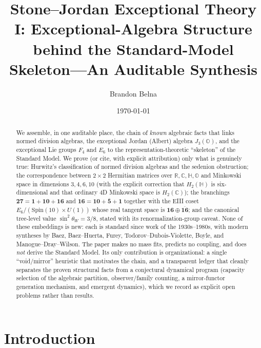 \documentclass[aps,prresearch,onecolumn,amsmath,amssymb,nofootinbib]{revtex4-2}
\theoremstyle{plain}\newtheorem{theorem}{Theorem}[section]\newtheorem{proposition}[theorem]{Proposition}\newtheorem{lemma}[theorem]{Lemma}\newtheorem{corollary}[theorem]{Corollary}
\theoremstyle{definition}\newtheorem{definition}[theorem]{Definition}\newtheorem{conjecture}[theorem]{Conjecture}
\theoremstyle{remark}\newtheorem{remark}[theorem]{Remark}
\begin{document}
\title{Stone--Jordan Exceptional Theory I: Exceptional-Algebra Structure behind the Standard-Model Skeleton---An Auditable Synthesis}
\author{Brandon Belna}
\date{\today}

\begin{abstract}
We assemble, in one auditable place, the chain of \emph{known} algebraic facts that links normed division algebras, the exceptional Jordan (Albert) algebra $J_3(\mathbb{O})$, and the exceptional Lie groups $F_4$ and $E_6$ to the representation-theoretic ``skeleton'' of the Standard Model. We prove (or cite, with explicit attribution) only what is genuinely true: Hurwitz's classification of normed division algebras and the sedenion obstruction; the correspondence between $2\times2$ Hermitian matrices over $\mathbb{R},\mathbb{C},\mathbb{H},\mathbb{O}$ and Minkowski space in dimensions $3,4,6,10$ (with the explicit correction that $H_2(\mathbb{H})$ is six-dimensional and that ordinary $4$D Minkowski space is $H_2(\mathbb{C})$); the branchings $\mathbf{27}=\mathbf{1}+\mathbf{10}+\mathbf{16}$ and $\mathbf{16}=\mathbf{10}+\bar{\mathbf 5}+\mathbf 1$ together with the EIII coset $E_6/(\mathrm{Spin}(10)\times U(1))$ whose real tangent space is $\mathbf{16}\oplus\overline{\mathbf{16}}$; and the canonical tree-level value $\sin^2\theta_W=3/8$, stated with its renormalization-group caveat. None of these embeddings is new: each is standard since work of the 1930s--1980s, with modern syntheses by Baez, Baez--Huerta, Furey, Todorov--Dubois-Violette, Boyle, and Manogue--Dray--Wilson. The paper makes no mass fits, predicts no coupling, and does \emph{not} derive the Standard Model. Its only contribution is organizational: a single ``void/mirror'' heuristic that motivates the chain, and a transparent ledger that cleanly separates the proven structural facts from a conjectural dynamical program (capacity selection of the algebraic partition, observer/family counting, a mirror-functor generation mechanism, and emergent dynamics), which we record as explicit open problems rather than results.
\end{abstract}


\maketitle

\section{Introduction}
\label{sec:intro}
\end{document}
